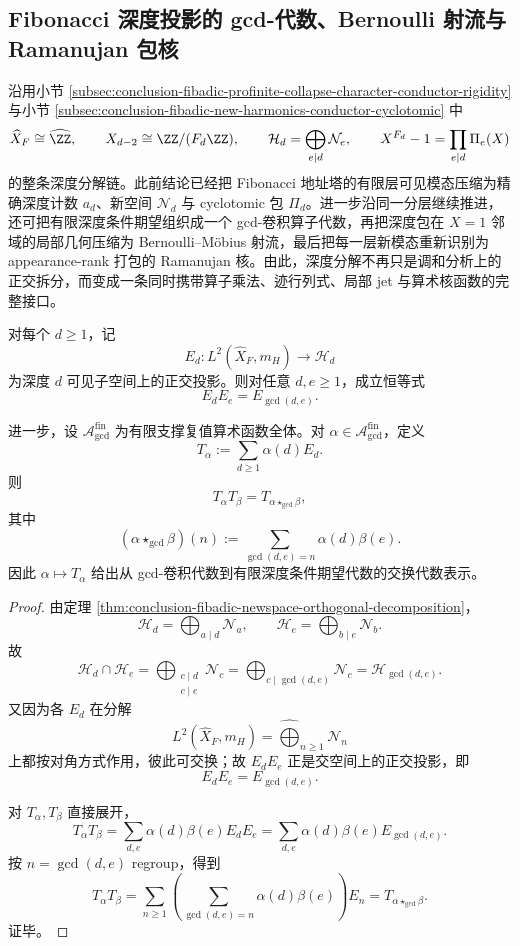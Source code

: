 \subsection{Fibonacci 深度投影的 gcd-代数、Bernoulli 射流与 Ramanujan 包核}\label{subsec:conclusion-fibadic-gcd-operator-bernoulli-ramanujan}
沿用小节 \ref{subsec:conclusion-fibadic-profinite-collapse-character-conductor-rigidity} 与小节 \ref{subsec:conclusion-fibadic-new-harmonics-conductor-cyclotomic} 中
\[
\widehat X_F\cong \widehat{\ZZ},
\qquad
X_{d-2}\cong \ZZ/(F_d\ZZ),
\qquad
\mathcal H_d=\bigoplus_{e\mid d}\mathcal N_e,
\qquad
X^{F_d}-1=\prod_{e\mid d}\Pi_e(X)
\]
的整条深度分解链。此前结论已经把 Fibonacci 地址塔的有限层可见模态压缩为精确深度计数 \(a_d\)、新空间 \(\mathcal N_d\) 与 cyclotomic 包 \(\Pi_d\)。进一步沿同一分层继续推进，还可把有限深度条件期望组织成一个 gcd-卷积算子代数，再把深度包在 \(X=1\) 邻域的局部几何压缩为 Bernoulli--Möbius 射流，最后把每一层新模态重新识别为 appearance-rank 打包的 Ramanujan 核。由此，深度分解不再只是调和分析上的正交拆分，而变成一条同时携带算子乘法、迹行列式、局部 jet 与算术核函数的完整接口。

\begin{theorem}\label{thm:conclusion-fibadic-conditional-expectation-gcd-algebra}
对每个 \(d\ge 1\)，记
\[
E_d:L^2(\widehat X_F,m_H)\to \mathcal H_d
\]
为深度 \(d\) 可见子空间上的正交投影。则对任意 \(d,e\ge 1\)，成立恒等式
\[
E_dE_e=E_{\gcd(d,e)}.
\]

进一步，设 \(\mathscr A_{\gcd}^{\mathrm{fin}}\) 为有限支撑复值算术函数全体。对 \(\alpha\in \mathscr A_{\gcd}^{\mathrm{fin}}\)，定义
\[
T_\alpha:=\sum_{d\ge 1}\alpha(d)E_d.
\]
则
\[
T_\alpha T_\beta=T_{\alpha\star_{\gcd}\beta},
\]
其中
\[
(\alpha\star_{\gcd}\beta)(n):=
\sum_{\gcd(d,e)=n}\alpha(d)\beta(e).
\]
因此 \(\alpha\mapsto T_\alpha\) 给出从 gcd-卷积代数到有限深度条件期望代数的交换代数表示。
\end{theorem}
\begin{proof}
由定理 \ref{thm:conclusion-fibadic-newspace-orthogonal-decomposition}，
\[
\mathcal H_d=\bigoplus_{a\mid d}\mathcal N_a,
\qquad
\mathcal H_e=\bigoplus_{b\mid e}\mathcal N_b.
\]
故
\[
\mathcal H_d\cap \mathcal H_e
=
\bigoplus_{\substack{c\mid d\\ c\mid e}}\mathcal N_c
=
\bigoplus_{c\mid \gcd(d,e)}\mathcal N_c
=
\mathcal H_{\gcd(d,e)}.
\]
又因为各 \(E_d\) 在分解
\[
L^2(\widehat X_F,m_H)=\widehat{\bigoplus}_{n\ge 1}\mathcal N_n
\]
上都按对角方式作用，彼此可交换；故 \(E_dE_e\) 正是交空间上的正交投影，即
\[
E_dE_e=E_{\gcd(d,e)}.
\]

对 \(T_\alpha,T_\beta\) 直接展开，
\[
T_\alpha T_\beta
=
\sum_{d,e}\alpha(d)\beta(e)E_dE_e
=
\sum_{d,e}\alpha(d)\beta(e)E_{\gcd(d,e)}.
\]
按 \(n=\gcd(d,e)\) regroup，得到
\[
T_\alpha T_\beta
=
\sum_{n\ge 1}
\left(
\sum_{\gcd(d,e)=n}\alpha(d)\beta(e)
\right)E_n
=
T_{\alpha\star_{\gcd}\beta}.
\]
证毕。
\end{proof}

